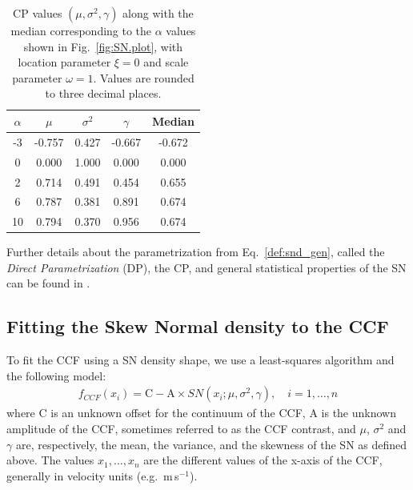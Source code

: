 \documentclass{aa}
\def\ms{\hbox{\,m\,s$^{-1}$}}         %
\begin{document}
\begin{table}[htbp]
\begin{center}
   \caption{CP values $(\mu, \sigma^2, \gamma)$ along with the median corresponding to the $\alpha$ values shown in Fig.~\ref{fig:SN.plot}, with location parameter $\xi = 0$ and scale parameter $\omega = 1$. Values are rounded to three decimal places.}
   \label{tab:cp_values}
   \begin{tabular}{|ccccc|} %
\hline
$\alpha$ & $\mu$ & $\sigma^2$ & $\gamma$  & Median \\
\hline
 -3 	&	 -0.757	&	 0.427	&	 -0.667  	& 	-0.672\\
0	&	 0.000 	&	1.000	&	 0.000 	& 	0.000\\
2	&	 0.714	&	 0.491	&	 0.454 	& 	0.655\\
6	&	 0.787	&	 0.381	&	 0.891 	& 	0.674\\
10	&	 0.794	&	 0.370	&	 0.956 	& 	0.674\\
\hline
   \end{tabular}

\end{center}
\end{table}
%
Further details about the parametrization from Eq.~\eqref{def:snd_gen}, called the \emph{Direct Parametrization} (DP), the CP, and general statistical properties of the SN can be found in \cite{Azzalini2014}.

\subsection{Fitting the Skew Normal density to the CCF} \label{sec:3}

To fit the CCF using a SN density shape, we use a least-squares algorithm and the following model:
%
\begin{eqnarray} \label{eq:3}
f_{CCF}(x_i) = \mathrm{C} - \mathrm{A} \times SN(x_i;\mu, \sigma^2, \gamma), \quad i = 1, \ldots, n
\end{eqnarray}
%
where C is an unknown offset for the continuum of the CCF, A is the unknown amplitude of the CCF, sometimes referred to as the CCF contrast, and $\mu$, $\sigma^2$ and $\gamma$ are, respectively, the mean, the variance, and the skewness of the SN as defined above.
The values $x_1, \ldots, x_n$ are the different values of the x-axis of the CCF, generally in velocity units (e.g. \ms).
\end{document}
